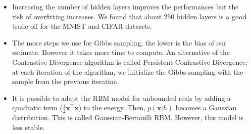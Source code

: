 \documentclass[landscape,a1paper,fontscale=0.5]{baposter} %
\newcommand{\compresslist}{ %
\setlength{\itemsep}{1pt}
\setlength{\parskip}{0pt}
\setlength{\parsep}{0pt}
}
\begin{document}
\begin{poster}
{\begin{multicols}{2}
\begin{itemize}\compresslist
\item Increasing the number of hidden layers improves the performances but the risk of overfitting increases. We found that about 250 hidden layers is a good trade-off for the MNIST and CIFAR datasets.
\item The more steps we use for Gibbs sampling, the lower is the bias of our estimate. However it takes more time to compute. An alternative of the Contrastive Divergence algorithm is called Persistent Contrastive Divergence: at each iteration of the algorithm, we initialize the Gibbs sampling with the sample from the previous iteration.
\item It is possible to adapt the RBM model for unbounded reals by adding a quadratic term ($\frac{1}{2}\mathbf{x}^\top \mathbf{x}$) to the energy. Then, $p(\mathbf{x}|h)$ becomes a Gaussian distribution. This is called Gaussian-Bernoulli RBM. However, this model is less stable.
\end{itemize}
\end{multicols}


}



\end{poster}
\end{document}
